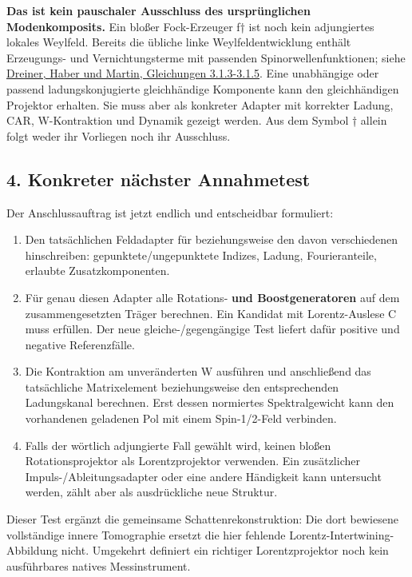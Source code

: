 \textbf{Das ist kein pauschaler Ausschluss des ursprünglichen
Modenkomposits.} Ein bloßer Fock-Erzeuger f† ist noch kein adjungiertes
lokales Weylfeld. Bereits die übliche linke Weylfeldentwicklung enthält
Erzeugungs- und Vernichtungsterme mit passenden Spinorwellenfunktionen;
siehe \href{https://arxiv.org/pdf/0812.1594\#page=24}{Dreiner, Haber und
Martin, Gleichungen 3.1.3-3.1.5}. Eine unabhängige oder passend
ladungskonjugierte gleichhändige Komponente kann den gleichhändigen
Projektor erhalten. Sie muss aber als konkreter Adapter mit korrekter
Ladung, CAR, W-Kontraktion und Dynamik gezeigt werden. Aus dem Symbol †
allein folgt weder ihr Vorliegen noch ihr Ausschluss.

\subsection{4. Konkreter nächster
Annahmetest}\label{konkreter-nuxe4chster-annahmetest}

Der Anschlussauftrag ist jetzt endlich und entscheidbar formuliert:

\begin{enumerate}
\def\labelenumi{\arabic{enumi}.}
\tightlist
\item
  Den tatsächlichen Feldadapter für 
  beziehungsweise den davon verschiedenen 
  hinschreiben: gepunktete/ungepunktete Indizes, Ladung, Fourieranteile,
  erlaubte Zusatzkomponenten.
\item
  Für genau diesen Adapter alle Rotations- \textbf{und Boostgeneratoren}
  auf dem zusammengesetzten Träger berechnen. Ein Kandidat mit
  Lorentz-Auslese C muss  erfüllen.
  Der neue gleiche-/gegengängige Test liefert dafür positive und
  negative Referenzfälle.
\item
  Die Kontraktion am unveränderten W ausführen und anschließend das
  tatsächliche Matrixelement  beziehungsweise den
  entsprechenden Ladungskanal berechnen. Erst dessen normiertes
  Spektralgewicht kann den vorhandenen geladenen Pol mit einem
  Spin-1/2-Feld verbinden.
\item
  Falls der wörtlich adjungierte Fall gewählt wird, keinen bloßen
  Rotationsprojektor als Lorentzprojektor verwenden. Ein zusätzlicher
  Impuls-/Ableitungsadapter oder eine andere Händigkeit kann untersucht
  werden, zählt aber als ausdrückliche neue Struktur.
\end{enumerate}

Dieser Test ergänzt die gemeinsame Schattenrekonstruktion: Die dort
bewiesene vollständige innere Tomographie ersetzt die hier fehlende
Lorentz-Intertwining-Abbildung nicht. Umgekehrt definiert ein richtiger
Lorentzprojektor noch kein ausführbares natives Messinstrument.

